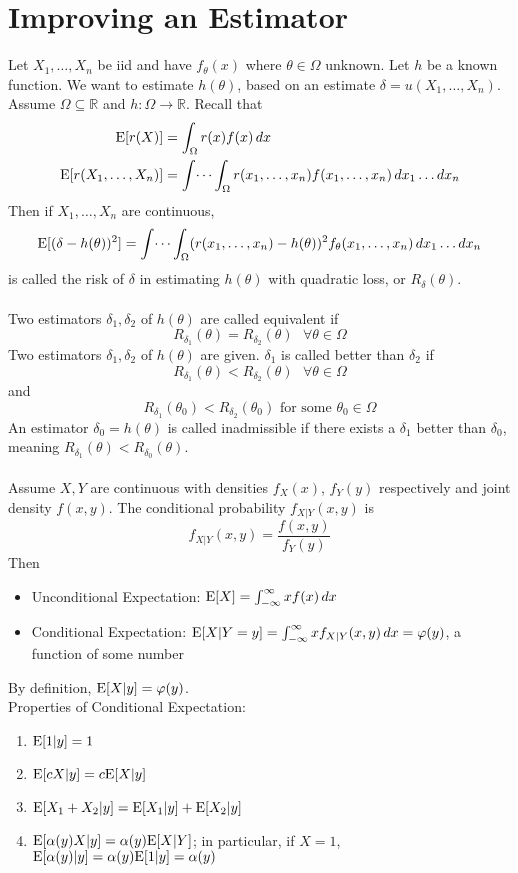 \documentclass[12pt]{article}
\begin{document}
\section{Improving an Estimator} 
Let $X_1,\dots,X_n$ be iid and have $f_\theta(x)$ where $\theta \in \Omega$ unknown. Let $h$ be a known function. We want to estimate $h(\theta)$, based on an estimate $\delta = u(X_1,\dots,X_n)$. Assume $\Omega \subseteq \mathbb{R}$ and $h: \Omega \to \mathbb{R}$. Recall that $$ \begin{aligned} \mathrm{E}[ r(X) ] &= \int_\Omega r(x)f(x)\, dx \\ \mathrm{E}[ r(X_1,\dots,X_n) ] &= \int \dots \int_\Omega r(x_1,\dots,x_n)f(x_1,\dots,x_n) \, dx_1\dots dx_n \end{aligned} $$ Then if $X_1,\dots,X_n$ are continuous, $$ \mathrm{E}[  (\delta - h(\theta))^2 ] = \int \dots \int_\Omega (r(x_1,\dots,x_n) - h(\theta))^2 f_\theta(x_1,\dots,x_n) \, dx_1 \dots dx_n $$ is called the risk of $\delta$ in estimating $h(\theta)$ with quadratic loss, or $R_\delta(\theta)$. \\~\\
Two estimators $\delta_1,\delta_2$ of $h(\theta)$ are called equivalent if $$R_{\delta_1}(\theta) = R_{\delta_2}(\theta) ~~~ \forall \theta \in \Omega $$ 
Two estimators $\delta_1,\delta_2$ of $h(\theta)$ are given. $\delta_1$ is called better than $\delta_2$ if $$R_{\delta_1}(\theta) < R_{\delta_2}(\theta) ~~~ \forall \theta \in \Omega $$ and $$R_{\delta_1}(\theta_0) < R_{\delta_2}(\theta_0) \text{ for some } \theta_0 \in \Omega $$ 
An estimator $\delta_0 = h(\theta)$ is called inadmissible if there exists a $\delta_1$ better than $\delta_0$, meaning $R_{\delta_1}(\theta) < R_{\delta_0}(\theta)$. \\~\\
Assume $X,Y$ are continuous with densities $f_X(x)$, $f_Y(y)$ respectively and joint density $f(x,y)$. The conditional probability $f_{X|Y}(x,y)$ is $$f_{X|Y}(x,y) = \frac{f(x,y)}{f_Y(y)} $$
Then \begin{itemize} 
\item Unconditional Expectation: $\mathrm{E}[ X ] = \int_{-\infty}^\infty xf(x)\, dx $
\item Conditional Expectation: $\mathrm{E}[ X|Y=y ] = \int_{-\infty}^\infty xf_{X|Y}(x,y)\, dx = \varphi(y)$, a function of some number \end{itemize} 
By definition, $\mathrm{E}[ X|y ] = \varphi(y)$. \\
Properties of Conditional Expectation: \begin{enumerate} 
\item $\mathrm{E}[ 1|y ] = 1$ 
\item $\mathrm{E}[ cX|y ] = c\mathrm{E}[ X|y ]$
\item $\mathrm{E}[ X_1+X_2|y ] = \mathrm{E}[ X_1|y ] + \mathrm{E}[ X_2|y ]$
\item $\mathrm{E}[ \alpha(y)X|y ] = \alpha(y)\mathrm{E}[ X|Y ]$; in particular, if $X=1$, $\mathrm{E}[ \alpha(y)|y ] = \alpha(y)\mathrm{E}[ 1|y ] = \alpha(y)$ \end{enumerate} 
\end{document}
